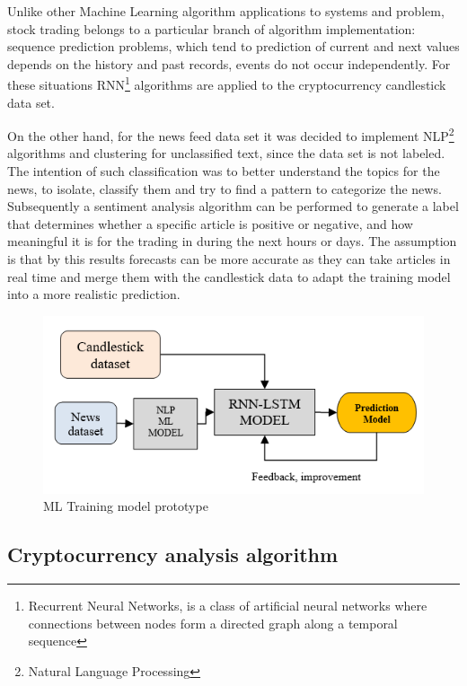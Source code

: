 Unlike other Machine Learning algorithm applications to systems  and problem, stock trading belongs to a particular branch of algorithm implementation: sequence prediction problems, which tend to prediction of current and next values depends on the history and past records, events do not occur independently. For these situations RNN\footnote{Recurrent Neural Networks, is a class of artificial neural networks where connections between nodes form a directed graph along a temporal sequence\cite{christopher_olah_understanding_2015}}  algorithms are applied to the cryptocurrency candlestick data set\cite{mittal_understanding_2019}.

On the other hand, for the news feed data set it was decided to implement NLP\footnote{Natural Language Processing} algorithms and clustering for unclassified text, since the data set is not labeled. The intention of such classification was to better understand the topics for the news, to isolate, classify them and try to find a pattern to categorize the news. Subsequently a sentiment analysis algorithm can be performed to generate a label that determines whether a specific article is positive or negative, and how meaningful it is for the trading in during the next hours or days. The assumption is that by this results forecasts can be more accurate as they can take articles in real time and merge them with the candlestick data to adapt the training model into a more realistic prediction.

\begin{figure}[H]
   \centering
   \includegraphics[width=\linewidth]{fig/RNNLSTM.png}
    \caption{ML Training model prototype}
    \label{fig:RNNLSTM}
\end{figure}

\subsection{Cryptocurrency analysis algorithm}

